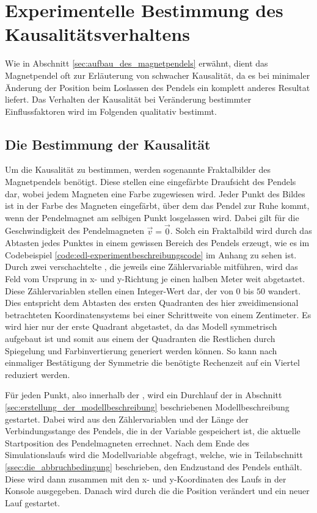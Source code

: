 \section{Experimentelle Bestimmung des Kausalitätsverhaltens}
\label{sec:experimentelle_bestimmung_des_kausalitätsverhaltens}

Wie in Abschnitt \ref{sec:aufbau_des_magnetpendels} erwähnt, dient das Magnetpendel oft zur Erläuterung von schwacher Kausalität, da es bei minimaler Änderung der Position beim Loslassen des Pendels ein komplett anderes Resultat liefert. Das Verhalten der Kausalität bei Veränderung bestimmter Einflussfaktoren wird im Folgenden qualitativ bestimmt.

\subsection{Die Bestimmung der Kausalität}
\label{ssec:die_bestimmung_der_kausalität}

Um die Kausalität zu bestimmen, werden sogenannte Fraktalbilder des Magnetpendels benötigt. Diese stellen eine eingefärbte Draufsicht des Pendels dar, wobei jedem Magneten eine Farbe zugewiesen wird. Jeder Punkt des Bildes ist in der Farbe des Magneten eingefärbt, über dem das Pendel zur Ruhe kommt, wenn der Pendelmagnet am selbigen Punkt losgelassen wird. Dabei gilt für die Geschwindigkeit des Pendelmagneten $\vec{v} = \vec{0}$. Solch ein Fraktalbild wird durch das Abtasten jedes Punktes in einem gewissen Bereich des Pendels erzeugt, wie es im Codebeispiel \ref{code:edl-experimentbeschreibungscode} im Anhang zu sehen ist. Durch zwei verschachtelte , die jeweils eine Zählervariable mitführen, wird das Feld vom Ursprung in x- und y-Richtung je einen halben Meter weit abgetastet. Diese Zählervariablen stellen einen Integer-Wert dar, der von $0$ bis $50$ wandert. Dies entspricht dem Abtasten des ersten Quadranten des hier zweidimensional betrachteten Koordinatensystems bei einer Schrittweite von einem Zentimeter. Es wird hier nur der erste Quadrant abgetastet, da das Modell symmetrisch aufgebaut ist und somit aus einem der Quadranten die Restlichen durch Spiegelung und Farbinvertierung generiert werden können. So kann nach einmaliger Bestätigung der Symmetrie die benötigte Rechenzeit auf ein Viertel reduziert werden.

Für jeden Punkt, also innerhalb der , wird ein Durchlauf der in Abschnitt \ref{sec:erstellung_der_modellbeschreibung} beschriebenen Modellbeschreibung gestartet. Dabei wird aus den Zählervariablen und der Länge der Verbindungsstange des Pendels, die in der Variable  gespeichert ist, die aktuelle Startposition des Pendelmagneten errechnet. Nach dem Ende des Simulationslaufs wird die Modellvariable  abgefragt, welche, wie in Teilabschnitt \ref{ssec:die_abbruchbedingung} beschrieben, den Endzustand des Pendels enthält. Diese wird dann zusammen mit den x- und y-Koordinaten des Laufs in der Konsole ausgegeben. Danach wird durch die  die Position verändert und ein neuer Lauf gestartet.

